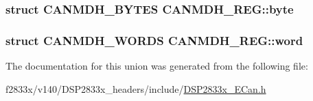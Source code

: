 \subsubsection[{byte}]{\setlength{\rightskip}{0pt plus 5cm}struct {\bf C\+A\+N\+M\+D\+H\+\_\+\+B\+Y\+T\+E\+S} C\+A\+N\+M\+D\+H\+\_\+\+R\+E\+G\+::byte}\label{union_c_a_n_m_d_h___r_e_g_a1e9652fe4fcf1d64bf3e863c9c4846d4}
\hypertarget{union_c_a_n_m_d_h___r_e_g_a4f5f9d12b59d5706e3b816bb548e4035}{}
\subsubsection[{word}]{\setlength{\rightskip}{0pt plus 5cm}struct {\bf C\+A\+N\+M\+D\+H\+\_\+\+W\+O\+R\+D\+S} C\+A\+N\+M\+D\+H\+\_\+\+R\+E\+G\+::word}\label{union_c_a_n_m_d_h___r_e_g_a4f5f9d12b59d5706e3b816bb548e4035}


The documentation for this union was generated from the following file\+:\begin{DoxyCompactItemize}
\item 
f2833x/v140/\+D\+S\+P2833x\+\_\+headers/include/\hyperlink{_d_s_p2833x___e_can_8h}{D\+S\+P2833x\+\_\+\+E\+Can.\+h}\end{DoxyCompactItemize}

